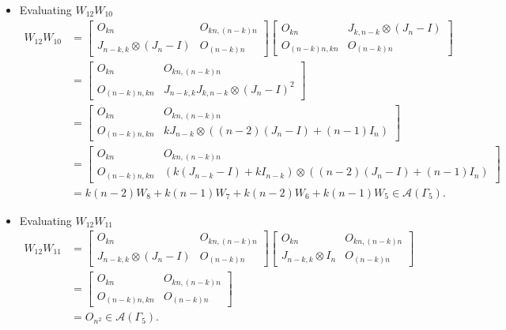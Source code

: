 \begin{itemize}
\item Evaluating $W_{12}W_{10}$
\begin{align*}
    W_{12}W_{10}
    &= \begin{bmatrix}
        O_{kn} & O_{kn, (n-k)n} \\
        J_{n-k, k}\otimes (J_n-I) & O_{(n-k)n}
    \end{bmatrix}
    \begin{bmatrix}
        O_{kn} & J_{k,n-k} \otimes (J_n-I) \\
        O_{(n-k)n,kn} & O_{(n-k)n}
    \end{bmatrix}\\
    &= \begin{bmatrix}
        O_{kn} & O_{kn, (n-k)n} \\
        O_{(n-k)n,kn} & J_{n-k, k}J_{k,n-k} \otimes (J_n-I)^2
    \end{bmatrix}\\
    &= \begin{bmatrix}
        O_{kn} & O_{kn, (n-k)n} \\
        O_{(n-k)n,kn} & kJ_{n-k} \otimes ((n-2)(J_n-I) + (n-1)I_n)
    \end{bmatrix}\\
    &= \begin{bmatrix}
        O_{kn} & O_{kn, (n-k)n} \\
        O_{(n-k)n,kn} & (k(J_{n-k}-I)+kI_{n-k}) \otimes ((n-2)(J_n-I) + (n-1)I_n)
    \end{bmatrix}\\
    &= k(n-2)W_8 + k(n-1)W_7 + k(n-2)W_6 + k(n-1)W_5\in\mathcal{A}(\Gamma_5).
\end{align*}

\item Evaluating $W_{12}W_{11}$
\begin{align*}
    W_{12}W_{11}
    &= \begin{bmatrix}
        O_{kn} & O_{kn, (n-k)n} \\
        J_{n-k, k}\otimes (J_n-I) & O_{(n-k)n}
    \end{bmatrix}
    \begin{bmatrix}
        O_{kn} & O_{kn, (n-k)n} \\
        J_{n-k, k}\otimes I_n & O_{(n-k)n}
    \end{bmatrix}\\
    &= \begin{bmatrix}
        O_{kn} & O_{kn, (n-k)n} \\
        O_{(n-k)n,kn} & O_{(n - k)n}
    \end{bmatrix}\\
    &= O_{n^2} \in\mathcal{A}(\Gamma_5).
\end{align*}


\end{itemize}
